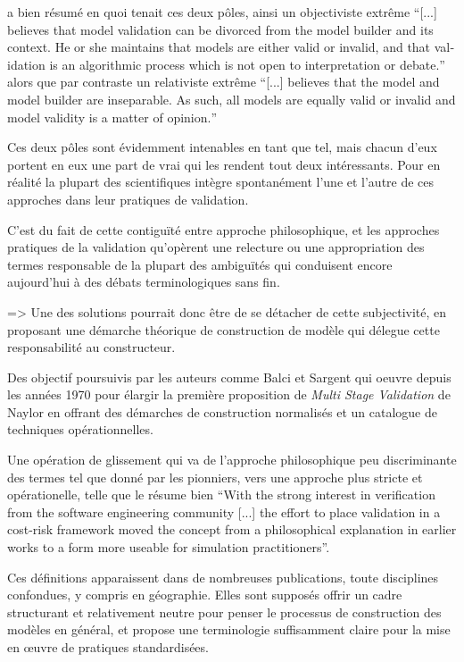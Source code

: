 \textcite{Kleindorfer1998} a bien résumé en quoi tenait ces deux pôles, ainsi un objectiviste extrême \foreignquote{english}{[...] believes that model validation can be divorced from the model builder and its context. He or she maintains that models are either valid or invalid, and that validation is an algorithmic process which is not open to interpretation or debate.} alors que par contraste un relativiste extrême \foreignquote{english}{[...] believes that the model and model builder are inseparable. As such, all models are equally valid or invalid and model validity is a matter of opinion.}

Ces deux pôles sont évidemment intenables en tant que tel, mais chacun d'eux portent en eux une part de vrai qui les rendent tout deux intéressants. Pour \textcite{Kleindorfer1998} en réalité la plupart des scientifiques intègre spontanément l'une et l'autre de ces approches dans leur pratiques de validation.

C'est du fait de cette contiguïté entre approche philosophique, et les approches pratiques de la validation qu'opèrent une relecture ou une appropriation des termes responsable de la plupart des ambiguïtés qui conduisent encore aujourd'hui à des débats terminologiques sans fin. \autocite{David2009}

=> Une des solutions pourrait donc être de se détacher de cette subjectivité, en proposant une démarche théorique de construction de modèle qui délegue cette responsabilité au constructeur.

Des objectif poursuivis par les auteurs comme Balci et Sargent qui oeuvre depuis les années 1970 pour élargir la première proposition de \textit{Multi Stage Validation} de Naylor en offrant des démarches de construction normalisés et un catalogue de techniques opérationnelles.

Une opération de glissement qui va de l'approche philosophique peu discriminante des termes tel que donné par les pionniers, vers une approche plus stricte et opérationelle, telle que le résume bien \textcite[165-166]{Nance2002} \foreignquote{english}{With the strong interest in verification from the software engineering community [...] the effort to place validation in a cost-risk framework moved the concept from a philosophical explanation in earlier works to a form more useable for simulation practitioners}.

Ces définitions apparaissent dans de nombreuses publications, toute disciplines confondues, y compris en géographie. Elles sont supposés offrir un cadre structurant et relativement neutre pour penser le processus de construction des modèles en général, et propose une terminologie suffisamment claire pour la mise en œuvre de pratiques standardisées. 

